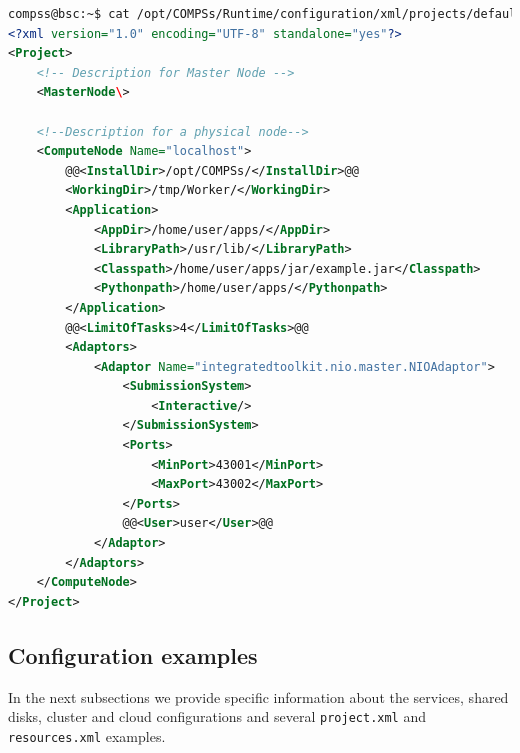 \begin{lstlisting}[language=xml,moredelim={[is][\textcolor{red}]{@@}{@@}}]
compss@bsc:~$ cat /opt/COMPSs/Runtime/configuration/xml/projects/default_project.xml
<?xml version="1.0" encoding="UTF-8" standalone="yes"?>
<Project>
    <!-- Description for Master Node --> 
    <MasterNode\>

    <!--Description for a physical node-->
    <ComputeNode Name="localhost">
        @@<InstallDir>/opt/COMPSs/</InstallDir>@@
        <WorkingDir>/tmp/Worker/</WorkingDir>
        <Application>
            <AppDir>/home/user/apps/</AppDir>
            <LibraryPath>/usr/lib/</LibraryPath>
            <Classpath>/home/user/apps/jar/example.jar</Classpath>
            <Pythonpath>/home/user/apps/</Pythonpath>
        </Application>
        @@<LimitOfTasks>4</LimitOfTasks>@@
        <Adaptors>
            <Adaptor Name="integratedtoolkit.nio.master.NIOAdaptor">
                <SubmissionSystem>
                    <Interactive/>
                </SubmissionSystem>
                <Ports>
                    <MinPort>43001</MinPort>
                    <MaxPort>43002</MaxPort>
                </Ports>
                @@<User>user</User>@@
            </Adaptor>
        </Adaptors>
    </ComputeNode>
</Project>
\end{lstlisting}
\label{lstlisting:project.xml}


\subsection{Configuration examples}
In the next subsections we provide specific information about the services, shared disks, cluster and cloud configurations and several \texttt{project.xml} and \texttt{resources.xml} examples. 


